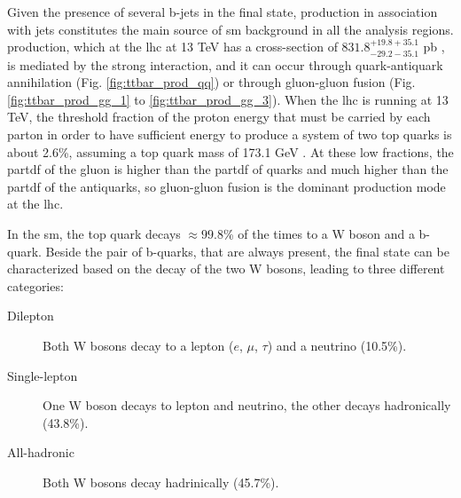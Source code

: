 Given the presence of several b-jets in the final state, \ttbar production in association with jets constitutes the main source of \gls{sm} background in all the analysis regions. \ttbar production, which at the \gls{lhc} at 13 TeV has a cross-section of $831.8^{+19.8 + 35.1}_{-29.2-35.1}$ pb \cite{Czakon:2013goa}, is mediated by the strong interaction, and it can occur through quark-antiquark annihilation (Fig. \ref{fig:ttbar_prod_qq}) or through gluon-gluon fusion (Fig. \ref{fig:ttbar_prod_gg_1} to \ref{fig:ttbar_prod_gg_3}). When the \gls{lhc} is running at 13 TeV, the threshold fraction of the proton energy that must be carried by each parton in order to have sufficient energy to produce a system of two top quarks 
is about 2.6\%, assuming a top quark mass of 173.1 GeV \cite{Patrignani:2016xqp}. 
At these low fractions, the \gls{partdf} of the gluon is higher than the \gls{partdf} of quarks and much higher than the \gls{partdf} of the antiquarks, so gluon-gluon fusion is the dominant \ttbar production mode at the \gls{lhc}.


In the \gls{sm}, the top quark decays $\approx 99.8$\% of the times to a W boson and a b-quark. 
Beside the pair of b-quarks, that are always present, the final state can be characterized based on the decay of the two W bosons, leading to three different categories:
\begin{description}
\item[Dilepton]  Both W bosons decay to a lepton ($e$, $\mu$, $\tau$) and a neutrino (10.5\%).
\item[Single-lepton] One W boson decays to lepton and neutrino, the other decays hadronically (43.8\%).
\item[All-hadronic] Both W bosons decay hadrinically (45.7\%).
\end{description}

